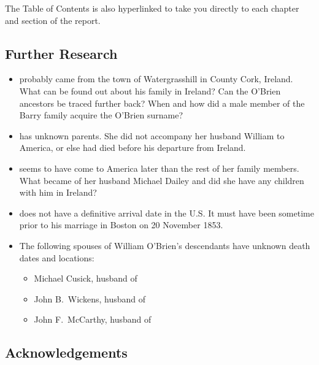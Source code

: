 The Table of Contents is also hyperlinked to take you directly to each chapter and section of the report.

\subsection{Further Research}

\begin{itemize}
	
	\item{} probably came from the town of Watergrasshill in County Cork, Ireland. What can be found out about his family in Ireland? Can the O'Brien ancestors be traced further back? When and how did a male member of the Barry family acquire the O'Brien surname?
	
	\item{} has unknown parents. She did not accompany her husband William to America, or else had died before his departure from Ireland. 
	
	\item{} seems to have come to America later than the rest of her family members. What became of her husband Michael Dailey and did she have any children with him in Ireland?
	
	\item{} does not have a definitive arrival date in the U.S. It must have been sometime prior to his marriage in Boston on 20 November 1853.
	
	\item The following spouses of William O'Brien's descendants have unknown death dates and locations:
	
	\begin{itemize}
		\item Michael Cusick, husband of 
		\item John B.\ Wickens, husband of 
		\item John F.\ McCarthy, husband of 
	\end{itemize}
	
\end{itemize}

\subsection{Acknowledgements}

